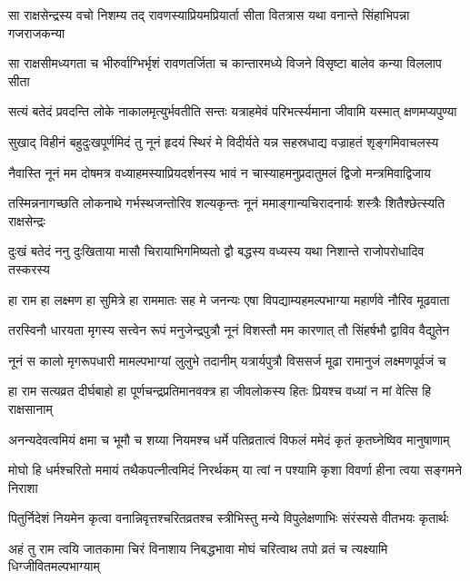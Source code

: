 
\twolineshloka
{सा राक्षसेन्द्रस्य वचो निशम्य तद् रावणस्याप्रियमप्रियार्ता}
{सीता वितत्रास यथा वनान्ते सिंहाभिपन्ना गजराजकन्या} %

\twolineshloka
{सा राक्षसीमध्यगता च भीरुर्वाग्भिर्भृशं रावणतर्जिता च}
{कान्तारमध्ये विजने विसृष्टा बालेव कन्या विललाप सीता} %

\twolineshloka
{सत्यं बतेदं प्रवदन्ति लोके नाकालमृत्युर्भवतीति सन्तः}
{यत्राहमेवं परिभर्त्स्यमाना जीवामि यस्मात् क्षणमप्यपुण्या} %

\twolineshloka
{सुखाद् विहीनं बहुदुःखपूर्णमिदं तु नूनं हृदयं स्थिरं मे}
{विदीर्यते यन्न सहस्रधाद्य वज्राहतं शृङ्गमिवाचलस्य} %

\twolineshloka
{नैवास्ति नूनं मम दोषमत्र वध्याहमस्याप्रियदर्शनस्य}
{भावं न चास्याहमनुप्रदातुमलं द्विजो मन्त्रमिवाद्विजाय} %

\twolineshloka
{तस्मिन्ननागच्छति लोकनाथे गर्भस्थजन्तोरिव शल्यकृन्तः}
{नूनं ममाङ्गान्यचिरादनार्यः शस्त्रैः शितैश्छेत्स्यति राक्षसेन्द्रः} %

\twolineshloka
{दुःखं बतेदं ननु दुःखिताया मासौ चिरायाभिगमिष्यतो द्वौ}
{बद्धस्य वध्यस्य यथा निशान्ते राजोपरोधादिव तस्करस्य} %

\twolineshloka
{हा राम हा लक्ष्मण हा सुमित्रे हा राममातः सह मे जनन्यः}
{एषा विपद्याम्यहमल्पभाग्या महार्णवे नौरिव मूढवाता} %

\twolineshloka
{तरस्विनौ धारयता मृगस्य सत्त्वेन रूपं मनुजेन्द्रपुत्रौ}
{नूनं विशस्तौ मम कारणात् तौ सिंहर्षभौ द्वाविव वैद्युतेन} %

\twolineshloka
{नूनं स कालो मृगरूपधारी मामल्पभाग्यां लुलुभे तदानीम्}
{यत्रार्यपुत्रौ विससर्ज मूढा रामानुजं लक्ष्मणपूर्वजं च} %

\twolineshloka
{हा राम सत्यव्रत दीर्घबाहो हा पूर्णचन्द्रप्रतिमानवक्त्र}
{हा जीवलोकस्य हितः प्रियश्च वध्यां न मां वेत्सि हि राक्षसानाम्} %

\twolineshloka
{अनन्यदेवत्वमियं क्षमा च भूमौ च शय्या नियमश्च धर्मे}
{पतिव्रतात्वं विफलं ममेदं कृतं कृतघ्नेष्विव मानुषाणाम्} %

\twolineshloka
{मोघो हि धर्मश्चरितो ममायं तथैकपत्नीत्वमिदं निरर्थकम्}
{या त्वां न पश्यामि कृशा विवर्णा हीना त्वया सङ्गमने निराशा} %

\twolineshloka
{पितुर्निदेशं नियमेन कृत्वा वनान्निवृत्तश्चरितव्रतश्च}
{स्त्रीभिस्तु मन्ये विपुलेक्षणाभिः संरंस्यसे वीतभयः कृतार्थः} %

\twolineshloka
{अहं तु राम त्वयि जातकामा चिरं विनाशाय निबद्धभावा}
{मोघं चरित्वाथ तपो व्रतं च त्यक्ष्यामि धिग्जीवितमल्पभाग्याम्} %

